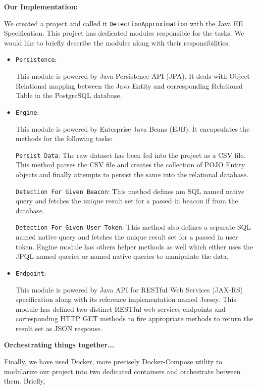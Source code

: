 \textbf{Our Implementation:}
\par We  created a project and called it \texttt{DetectionApproximation} with the Java EE Specification. This project has dedicated modules responsible for the tasks. We would like to briefly describe the modules along with their responsibilities. 
\begin{itemize}
	
	\item \texttt{Persistence}: 
	\par This module is powered by Java Persistence API (JPA). It deals with Object Relational mapping between the Java Entity and corresponding  Relational Table in the PostgreSQL database.

	\item \texttt{Engine}: 
	\par This module is powered by Enterprise Java Beans (EJB). It encapsulates the methods for the following tasks:
	
		\subitem{-} \texttt{Persist Data}: The raw dataset has been fed into the project as a CSV file. This method parses the CSV file and creates the collection of POJO Entity objects and finally attempts to persist the same into the relational database.
		
		\subitem{-} \texttt{Detection For Given Beacon}: This method defines am SQL named native query and fetches the unique result set for a passed in beacon if from the database.
		
		\subitem{-} \texttt{Detection For Given User Token}: This method also defines a separate SQL named native query and fetches the unique result set for a passed in user token.
	Engine module has others helper methods as well which either uses the JPQL named queries or named native queries to manipulate the data.
	
	\item \texttt{Endpoint}: 
	\par This module is powered by Java API for RESTful Web Services (JAX-RS) specification along with its reference implementation named Jersey. This module has defined two distinct RESTful web services endpoints and corresponding HTTP GET methods to fire appropriate methods to return the result set as JSON response.
\end{itemize}

\textbf{Orchestrating things together...}
\par Finally, we have used Docker, more precisely Docker-Compose\cite{DockerCompose} utility to modularize our project into two dedicated containers and orchestrate between them. Briefly, 

